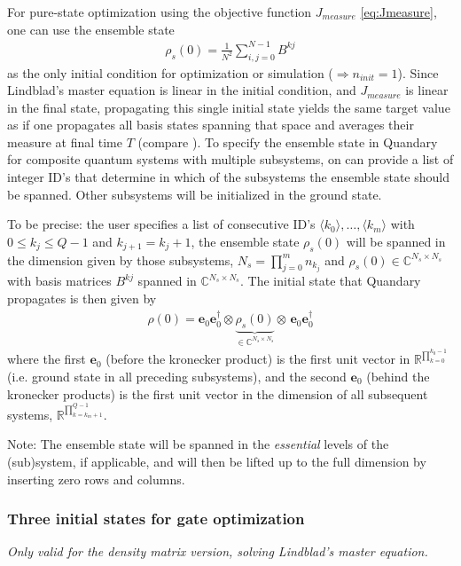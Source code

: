 \documentclass[11pt]{article}
\newcommand{\R}{\mathds{R}}
\newcommand{\C}{\mathds{C}}
\newcommand{\bs}[1]{{\boldsymbol{#1}}}
\begin{document}
For pure-state optimization using the objective function $J_{measure}$ \eqref{eq:Jmeasure}, one can use the ensemble state 
\begin{align}\label{eq:ensemblestate}
  \rho_s(0) = \frac{1}{N^2}\sum_{i,j=0}^{N-1} B^{kj}
\end{align}
as the only initial condition for optimization or simulation ($\Rightarrow n_{init}=1$). Since Lindblad's master equation is linear in the initial condition, and $J_{measure}$ is linear in the final state, propagating this single initial state yields the same target value as if one propagates all basis states spanning that space and averages their measure at final time $T$ (compare \cite{guenther2021quantum}). To specify the ensemble state in Quandary for composite quantum systems with multiple subsystems, on can provide a list of integer ID's that determine in which of the subsystems the ensemble state should be spanned. Other subsystems will be initialized in the ground state. 

To be precise: the user specifies a list of consecutive ID's $\langle k_0 \rangle, \dots, \langle k_m \rangle$ with $0 \leq k_j \leq Q-1$ and $k_{j+1} = k_j+1$, the ensemble state $\rho_s(0)$ will be spanned in the dimension given by those subsystems, $N_s = \prod_{j=0}^{m} n_{k_j}$ and $\rho_s(0) \in \C^{N_s\times N_s}$ with basis matrices $B^{kj}$ spanned in $\C^{N_s\times N_s}$. The initial state that Quandary propagates is then given by 
\begin{align}
  \rho(0) = \bs{e}_0\bs{e}_0^\dagger \otimes \underbrace{\rho_s(0)}_{\in \C^{N_s\times N_s}} \otimes \, \bs{e}_0 \bs{e}_0^\dagger
\end{align}
where the first $\bs{e}_0$ (before the kronecker product) is the first unit vector in $\R^{\prod_{k=0}^{k_0-1}}$ (i.e. ground state in all preceding subsystems), and the second $\bs{e}_0$ (behind the kronecker products) is the first unit vector in the dimension of all subsequent systems, $\R^{\prod_{k=k_m+1}^{Q-1}}$. 

Note: The ensemble state will be spanned in the \textit{essential} levels of the (sub)system, if applicable, and will then be lifted up to the full dimension by inserting zero rows and columns. 

\subsubsection{Three initial states for gate optimization}\label{subsec:threeinitcond}
\textit{Only valid for the density matrix version, solving Lindblad's master equation.}
\end{document}

